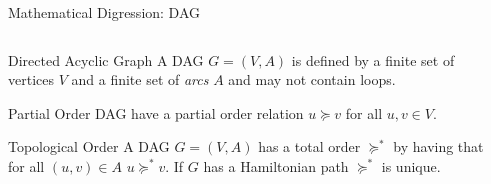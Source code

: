 \documentclass[xetex, handout]{beamer}
\begin{document}
\begin{frame}[fragile]{Mathematical Digression: DAG}
  \begin{columns}
    \begin{column}{.55\linewidth}
      \begin{block}{Directed Acyclic Graph}
        A DAG $G = (V,A)$ is defined by a finite set of vertices $V$ and a
        finite set of \emph{arcs} $A$ and may not contain loops.
      \end{block}

      \begin{block}{Partial Order}
        DAG have a partial order relation $u \succeq v$ for all $u,v \in V$.
      \end{block}

      \begin{alertblock}{Topological Order}
        A DAG $G = (V,A)$ has a total order $\succeq^*$ by having that for all
        $(u, v) \in A$ $u \succeq^* v$. If $G$ has a Hamiltonian path
        $\succeq^*$
        is unique.
      \end{alertblock}
    \end{column}
    \begin{column}{.45\linewidth}
\end{column}
\end{columns}
\end{frame}
\end{document}
